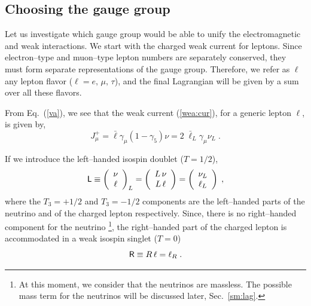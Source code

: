 \documentclass[12pt]{report}
\newcommand{\gc}{\gamma_5}
\newcommand{\g}{\gamma}
\newcommand{\ld}{\mbox{\sf L}}
\newcommand{\rs}{\mbox{\sf R}}
\newcommand{\ba}{\begin{array}}
\newcommand{\ea}{\end{array}}
\begin{document}

\subsection{Choosing the gauge group} \indent

Let us investigate which gauge group would be able to unify the
electromagnetic and weak interactions. We start with the charged weak
current for leptons. Since electron--type and muon--type lepton
numbers are separately conserved, they must form separate
representations of the gauge group. Therefore, we refer as $\ell$ any
lepton flavor ($\ell = e,\, \mu,\, \tau$), and the final Lagrangian
will be given by a sum over all these flavors. 

From Eq.\ (\ref{va}), we see that the weak current (\ref{wea:cur}),
for a generic lepton $\ell$, is given by,
\begin{equation}
J_\mu^+ = \bar{\ell} \g_\mu (1 - \gc) \nu = 2 \; \bar{\ell}_L \g_\mu
\nu_L \; .
\label{wea:cur:2}
\end{equation}

If we introduce the left--handed isospin doublet ($T = 1/2$),
\begin{equation}
\ld \equiv 	\left( \ba{c}
	      		\nu\\
	      		\ell
              \ea \right)_L = 
	\left( \ba{c}
	      		L \, \nu\\
	      		L \, \ell
              \ea \right) = 
	\left( \ba{c}
	      		\nu_L\\
	      		\ell_L
              \ea \right) \; ,
\label{l}
\end{equation}
where the $T_3 = + 1/2$ and $T_3 = - 1/2$ components are the
left--handed parts of the neutrino and of the charged lepton
respectively. Since, there is no right--handed component for the
neutrino \footnote{At this moment, we consider that the  neutrinos
are massless. The possible mass term for the neutrinos will be 
discussed later, Sec.\ \ref{sm:lag}.}, the right--handed part of the
charged lepton is accommodated in a weak isospin singlet ($T =0$)
\begin{equation}
\rs \equiv R \, \ell = \ell_R  \; .
\label{r}
\end{equation}
\end{document}
